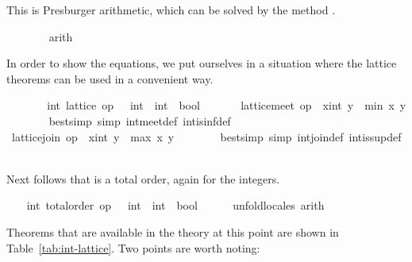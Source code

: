 \begin{isabellebody}
\begin{isamarkuptxt}
\begin{isabelle}
\end{isabelle}
	This is Presburger arithmetic, which can be solved by the
        method .%
\end{isamarkuptxt}%
\isamarkuptrue%
\ \ \ \ \ \ \isamarkupfalse%
\ arith{\isacharplus}%
\begin{isamarkuptxt}%
\normalsize In order to show the equations, we put ourselves
      in a situation where the lattice theorems can be used in a
      convenient way.%
\end{isamarkuptxt}%
\isamarkuptrue%
\ \ \ \ \isamarkupfalse%
\ \isamarkupfalse%
\ int{\isacharcolon}\ lattice\ {\isachardoublequoteopen}op\ {\isasymle}\ {\isacharcolon}{\isacharcolon}\ int\ {\isasymRightarrow}\ int\ {\isasymRightarrow}\ bool{\isachardoublequoteclose}\ \isacommand{{\isachardot}}\isamarkupfalse%
\isanewline
\ \ \ \ \isamarkupfalse%
\ {\isachardoublequoteopen}lattice{\isachardot}meet\ op\ {\isasymle}\ {\isacharparenleft}x{\isacharcolon}{\isacharcolon}int{\isacharparenright}\ y\ {\isacharequal}\ min\ x\ y{\isachardoublequoteclose}\isanewline
\ \ \ \ \ \ \isamarkupfalse%
\ {\isacharparenleft}bestsimp\ simp{\isacharcolon}\ int{\isachardot}meet{\isacharunderscore}def\ int{\isachardot}is{\isacharunderscore}inf{\isacharunderscore}def{\isacharparenright}\isanewline
\ \ \ \ \isamarkupfalse%
\ {\isachardoublequoteopen}lattice{\isachardot}join\ op\ {\isasymle}\ {\isacharparenleft}x{\isacharcolon}{\isacharcolon}int{\isacharparenright}\ y\ {\isacharequal}\ max\ x\ y{\isachardoublequoteclose}\isanewline
\ \ \ \ \ \ \isamarkupfalse%
\ {\isacharparenleft}bestsimp\ simp{\isacharcolon}\ int{\isachardot}join{\isacharunderscore}def\ int{\isachardot}is{\isacharunderscore}sup{\isacharunderscore}def{\isacharparenright}\isanewline
\ \ \isamarkupfalse%
%
\endisatagvisible
{\isafoldvisible}%
%
\isadelimvisible
%
\endisadelimvisible
%
\begin{isamarkuptext}%
Next follows that  is a total order, again for
  the integers.%
\end{isamarkuptext}%
\isamarkuptrue%
%
\isadelimvisible
\ \ %
\endisadelimvisible
%
\isatagvisible
{}\isamarkupfalse%
\ int{\isacharcolon}\ total{\isacharunderscore}order\ {\isachardoublequoteopen}op\ {\isasymle}\ {\isacharcolon}{\isacharcolon}\ int\ {\isasymRightarrow}\ int\ {\isasymRightarrow}\ bool{\isachardoublequoteclose}\isanewline
\ \ \ \ \isamarkupfalse%
\ unfold{\isacharunderscore}locales\ arith%
\endisatagvisible
{\isafoldvisible}%
%
\isadelimvisible
%
\endisadelimvisible
%
\begin{isamarkuptext}%
Theorems that are available in the theory at this point are shown in
  Table~\ref{tab:int-lattice}.  Two points are worth noting:


\end{isamarkuptext}
\end{isabellebody}
